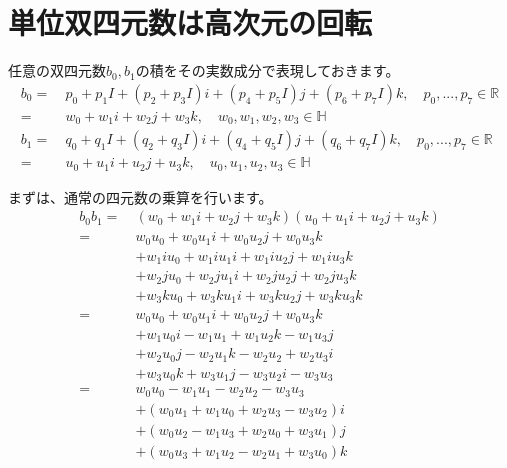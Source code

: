 \documentclass[a4paper,12pt,notitlepage]{jsreport}
\begin{document}
\section{単位双四元数は高次元の回転}

任意の双四元数$b_0,b_1$の積をその実数成分で表現しておきます。
\begin{equation}
  \begin{split}
    b_0=~&p_0+p_1I+(p_2+p_3I)i+(p_4+p_5I)j+(p_6+p_7I)k,\quad p_0,...,p_7\in\mathbb{R}\\
    =~&w_0+w_1i+w_2j+w_3k,\quad w_0,w_1,w_2,w_3\in\mathbb{H}\\
    b_1=~&q_0+q_1I+(q_2+q_3I)i+(q_4+q_5I)j+(q_6+q_7I)k,\quad p_0,...,p_7\in\mathbb{R}\\
    =~&u_0+u_1i+u_2j+u_3k,\quad u_0,u_1,u_2,u_3\in\mathbb{H}
  \end{split}
\end{equation}

まずは、通常の四元数の乗算を行います。
\begin{equation}
  \begin{split}
    b_0b_1=~&(w_0+w_1i+w_2j+w_3k)(u_0+u_1i+u_2j+u_3k)\\
    =~&w_0u_0+w_0u_1i+w_0u_2j+w_0u_3k\\
    &+w_1iu_0+w_1iu_1i+w_1iu_2j+w_1iu_3k\\
    &+w_2ju_0+w_2ju_1i+w_2ju_2j+w_2ju_3k\\
    &+w_3ku_0+w_3ku_1i+w_3ku_2j+w_3ku_3k\\
    =~&w_0u_0+w_0u_1i+w_0u_2j+w_0u_3k\\
    &+w_1u_0i-w_1u_1+w_1u_2k-w_1u_3j\\
    &+w_2u_0j-w_2u_1k-w_2u_2+w_2u_3i\\
    &+w_3u_0k+w_3u_1j-w_3u_2i-w_3u_3\\
    =~&w_0u_0-w_1u_1-w_2u_2-w_3u_3\\
    &+(w_0u_1+w_1u_0+w_2u_3-w_3u_2)i\\
    &+(w_0u_2-w_1u_3+w_2u_0+w_3u_1)j\\
    &+(w_0u_3+w_1u_2-w_2u_1+w_3u_0)k
  \end{split}
\end{equation}
\end{document}
